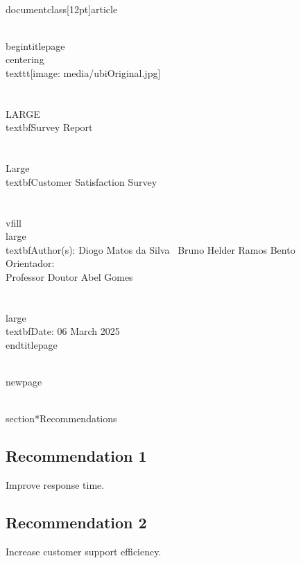 \\documentclass[12pt]{article}
\begin{document}
\\begin{titlepage}
    \\centering
    \\texttt{[image: media/ubiOriginal.jpg]} \\\\[2em]
    
    {\\LARGE \\textbf{Survey Report}} \\\\[1em]
    {\\Large \\textbf{Customer Satisfaction Survey}} \\\\[2em]
    
    \\vfill
    {\\large \\textbf{Author(s):} Diogo Matos da Silva \ Bruno Helder Ramos Bento \\ Orientador: \\ Professor Doutor Abel Gomes} \\\\[0.5em]
    {\\large \\textbf{Date:} 06 March 2025}
\\end{titlepage}

\\newpage

\\section*{Recommendations}

\subsection*{Recommendation 1} Improve response time. 
\subsection*{Recommendation 2} Increase customer support efficiency.

\
\end{document}
